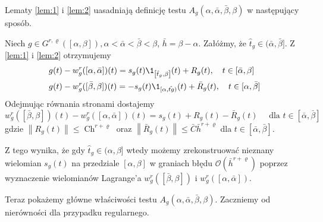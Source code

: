 \documentclass[oik, pdftex, robocza, man]{mgrwms}
\begin{document}
    Lematy \eqref{lem:1} i \eqref{lem:2} uasadniają definicję testu $A_{g}(\alpha, \bar{\alpha}, \bar{\beta}, \beta)$ w następujący sposób.

    Niech $g \in G^{r, \varrho}([\alpha, \beta]), \alpha<\bar{\alpha}<\bar{\beta}<\beta$, $\bar{h}=\beta-\alpha$. Załóżmy, że $\hat{t}_{g} \in(\bar{\alpha}, \bar{\beta}]$. Z \eqref{lem:1} i \eqref{lem:2} otrzymujemy
    \begin{equation*}
        \begin{aligned}
            &g(t)-w_{g}^{r}([\alpha, \bar{\alpha}])(t)=s_{g}(t) \1_{\left[\hat{t}_{g}, \beta\right]}(t)+R_{g}(t), \quad t \in[\bar{\alpha}, \beta] \\
            &g(t)-w_{g}^{r}([\bar{\beta}, \beta])(t)=-s_{g}(t) \1_{[\alpha, \hat{t g})}(t)+\bar{R}_{g}(t), \quad t \in[\alpha, \bar{\beta}]
        \end{aligned}
    \end{equation*}
    Odejmując równania stronami dostajemy
    \begin{equation} \label{eq:16}
        w_{g}^{r}([\bar{\beta}, \beta])(t)-w_{g}^{r}([\alpha, \bar{\alpha}])(t)=s_{g}(t)+R_{g}(t)-\bar{R}_{g}(t) \quad \text{ dla }t \in[\bar{\alpha}, \bar{\beta}]
    \end{equation}
    gdzie $\left\|R_{g}(t)\right\| \leq \operatorname{Ch}^{r+\varrho}$ oraz $\left\|\bar{R}_{g}(t)\right\| \leq \bar{C} \bar{h}^{r+\varrho}$ dla $t \in[\bar{\alpha}, \bar{\beta}]$.

    Z tego wynika, że gdy $\hat{t}_{g} \in (\alpha, \beta]$ wtedy możemy zrekonstruować nieznany wielomian $s_{g}(t)$ na przedziale $[\alpha, \beta]$ w graniach błędu $\mathcal{O}(\bar{h}^{r+\varrho})$ poprzez wyznaczenie wielomianów Lagrange'a $w_{g}^{r}([\bar{\beta}, \beta])$ i $w_{g}^{r}([\alpha, \bar{\alpha}])$.

    Teraz pokażemy główne właściwości testu $A_{g}(\alpha, \bar{\alpha}, \bar{\beta}, \beta)$. Zaczniemy od nierówności dla przypadku regularnego.
\end{document}

